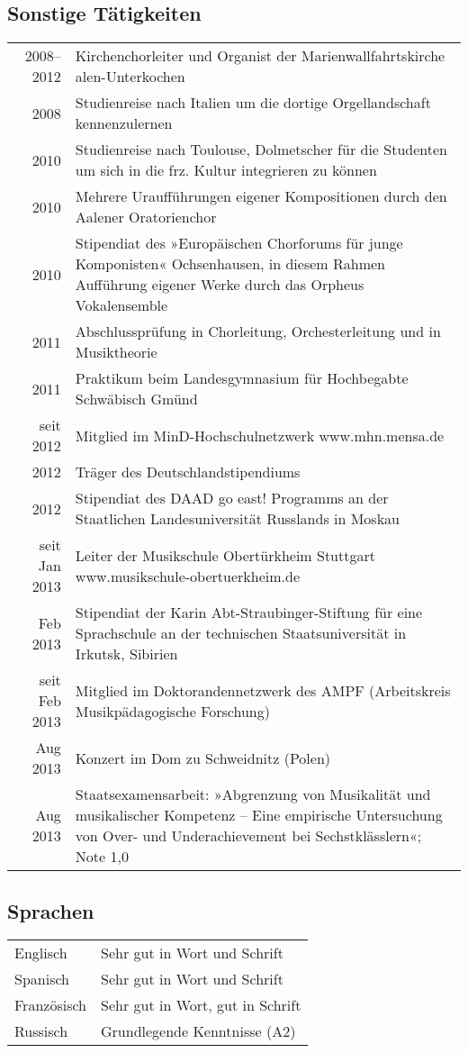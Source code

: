 \documentclass[11pt]{article}
\begin{document}
\subsection{Sonstige Tätigkeiten}
\label{sec-3-3}
\begin{center}
\begin{tabular}{rl}
\hline
2008–2012 & Kirchenchorleiter und Organist der Marienwallfahrtskirche alen-Unterkochen\\
2008 & Studienreise nach Italien um die dortige Orgellandschaft kennenzulernen\\
2010 & Studienreise nach Toulouse, Dolmetscher für die Studenten um sich in die frz. Kultur integrieren zu können\\
2010 & Mehrere Uraufführungen eigener Kompositionen durch den Aalener Oratorienchor\\
2010 & Stipendiat des »Europäischen Chorforums für junge Komponisten« Ochsenhausen, in diesem Rahmen Aufführung eigener Werke durch das Orpheus Vokalensemble\\
2011 & Abschlussprüfung in Chorleitung, Orchesterleitung und in Musiktheorie\\
2011 & Praktikum beim Landesgymnasium für Hochbegabte Schwäbisch Gmünd\\
seit 2012 & Mitglied im MinD-Hochschulnetzwerk www.mhn.mensa.de\\
2012 & Träger des Deutschlandstipendiums\\
2012 & Stipendiat des DAAD go east! Programms an der Staatlichen Landesuniversität Russlands in Moskau\\
seit Jan 2013 & Leiter der Musikschule Obertürkheim Stuttgart www.musikschule-obertuerkheim.de\\
Feb 2013 & Stipendiat der Karin Abt-Straubinger-Stiftung für eine Sprachschule an der technischen Staatsuniversität in Irkutsk, Sibirien\\
seit Feb 2013 & Mitglied im Doktorandennetzwerk des AMPF (Arbeitskreis Musikpädagogische Forschung)\\
Aug 2013 & Konzert im Dom zu Schweidnitz (Polen)\\
Aug 2013 & Staatsexamensarbeit: »Abgrenzung von Musikalität und musikalischer Kompetenz – Eine empirische Untersuchung von Over- und Underachievement bei Sechstklässlern«; Note 1,0\\
\hline
\end{tabular}
\end{center}
\subsection{Sprachen}
\label{sec-3-4}
\begin{center}
\begin{tabular}{ll}
\hline
Englisch & Sehr gut in Wort und Schrift\\
Spanisch & Sehr gut in Wort und Schrift\\
Französisch & Sehr gut in Wort, gut in Schrift\\
Russisch & Grundlegende Kenntnisse (A2)\\
\hline
\end{tabular}
\end{center}
\end{document}
